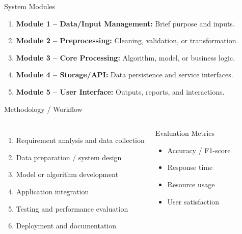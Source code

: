\documentclass[aspectratio=169,11pt]{beamer}
\begin{document}
\begin{frame}{System Modules}
  \begin{enumerate}
    \item \textbf{Module 1 -- Data/Input Management:} Brief purpose and inputs.
    \item \textbf{Module 2 -- Preprocessing:} Cleaning, validation, or transformation.
    \item \textbf{Module 3 -- Core Processing:} Algorithm, model, or business logic.
    \item \textbf{Module 4 -- Storage/API:} Data persistence and service interfaces.
    \item \textbf{Module 5 -- User Interface:} Outputs, reports, and interactions.
  \end{enumerate}
\end{frame}

\begin{frame}{Methodology / Workflow}
  \begin{columns}[T,onlytextwidth]
      \begin{enumerate}
        \item Requirement analysis and data collection
        \item Data preparation / system design
        \item Model or algorithm development
        \item Application integration
        \item Testing and performance evaluation
        \item Deployment and documentation
      \end{enumerate}
      \begin{block}{Evaluation Metrics}
        \begin{itemize}
          \item Accuracy / F1-score
          \item Response time
          \item Resource usage
          \item User satisfaction
        \end{itemize}
      \end{block}
  \end{columns}
\end{frame}
\end{document}
